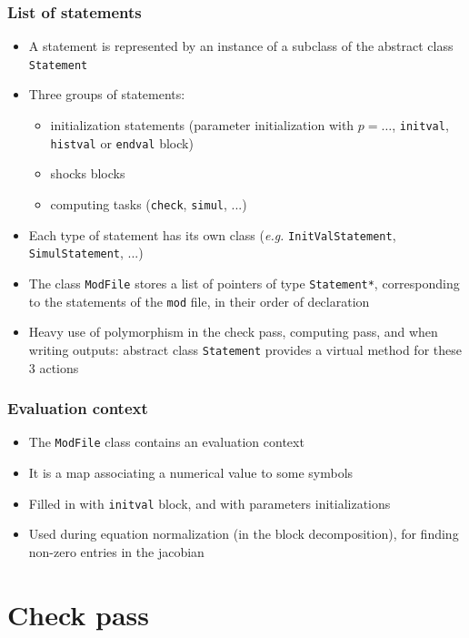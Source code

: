\documentclass{beamer}
\begin{document}
\begin{frame}
  \frametitle{List of statements}
  \begin{itemize}
  \item A statement is represented by an instance of a subclass of the abstract class \texttt{Statement}
  \item Three groups of statements:
    \begin{itemize}
    \item initialization statements (parameter initialization with $p = \ldots$, \texttt{initval}, \texttt{histval} or \texttt{endval} block)
    \item shocks blocks
    \item computing tasks (\texttt{check}, \texttt{simul}, ...)
    \end{itemize}
  \item Each type of statement has its own class (\textit{e.g.} \texttt{InitValStatement}, \texttt{SimulStatement}, ...)
  \item The class \texttt{ModFile} stores a list of pointers of type \texttt{Statement*}, corresponding to the statements of the \texttt{mod} file, in their order of declaration
  \item Heavy use of polymorphism in the check pass, computing pass, and when writing outputs: abstract class \texttt{Statement} provides a virtual method for these 3 actions
  \end{itemize}
\end{frame}

\begin{frame}
  \frametitle{Evaluation context}
  \begin{itemize}
  \item The \texttt{ModFile} class contains an \alert{evaluation context}
  \item It is a map associating a numerical value to some symbols
  \item Filled in with \texttt{initval} block, and with parameters initializations
  \item Used during equation normalization (in the block decomposition), for finding non-zero entries in the jacobian
  \end{itemize}
\end{frame}

\section{Check pass}
\end{document}
